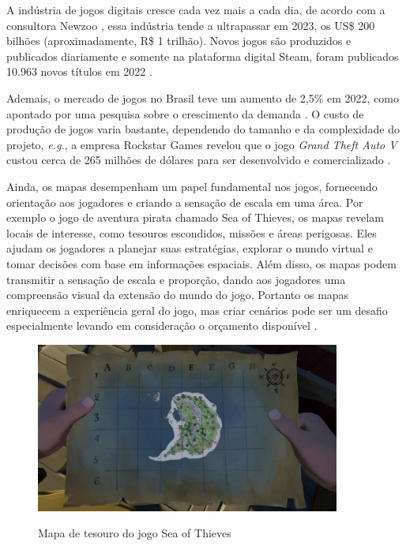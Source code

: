 
A indústria de jogos digitais cresce cada vez mais a cada dia, de acordo com a consultora Newzoo \space\cite{quanto_games_vao_movimentar}, essa indústria tende a ultrapassar em 2023, os US\$ 200 bilhões (aproximadamente, R\$ 1 trilhão). Novos jogos são produzidos e publicados diariamente e somente na plataforma digital Steam, foram publicados 10.963 novos títulos em 2022\space
\cite{numero_de_jogos_publicados_na_steam}.

Ademais, o mercado de jogos no Brasil teve um aumento de 2,5\% em 2022, como apontado por uma pesquisa sobre o crescimento da demanda \space \cite{pesquisa_games_brasil}. O custo de produção de jogos varia bastante, dependendo do tamanho e da complexidade do projeto, \emph{e.g.}, a empresa Rockstar Games revelou que o jogo \textit{Grand Theft Auto V} custou cerca de 265 milhões de dólares para ser desenvolvido e comercializado \space
\cite{gta_quanto_custou}.

Ainda, os mapas desempenham um papel fundamental nos jogos, fornecendo orientação aos jogadores e criando a sensação de escala em uma área. Por exemplo o jogo de aventura pirata chamado Sea of Thieves, os mapas revelam locais de interesse, como tesouros escondidos, missões e áreas perigosas. Eles ajudam os jogadores a planejar suas estratégias, explorar o mundo virtual e tomar decisões com base em informações espaciais. Além disso, os mapas podem transmitir a sensação de escala e proporção, dando aos jogadores uma compreensão visual da extensão do mundo do jogo. Portanto os mapas enriquecem a experiência geral do jogo, mas criar cenários pode ser um desafio especialmente levando em consideração o orçamento disponível \cite{video-game-maps, lecafedugeek}.

\begin{figure}[H]
	\caption{Mapa de tesouro do jogo Sea of Thieves}
	\centering %
	\includegraphics[width=10cm]{figures/Treasure_Map.jpg} %
	\label{fig:treasureMap}
\end{figure}

